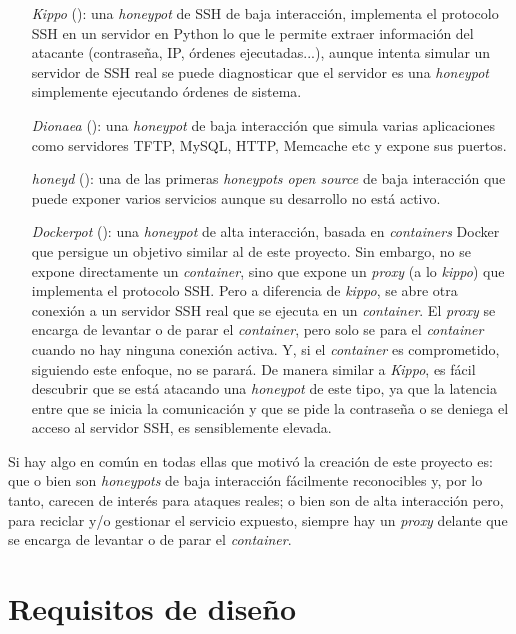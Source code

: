 \begin{enumerate}
    \item[\emph{Kippo}] (\cite{honeynet-kippo}): una \emph{honeypot} de SSH de baja interacción, implementa el protocolo SSH en un servidor en Python
    lo que le permite extraer información del atacante (contraseña, IP, órdenes ejecutadas...), aunque intenta simular un servidor de SSH real
    se puede diagnosticar que el servidor es una \emph{honeypot} simplemente ejecutando órdenes de sistema.
    \item[\emph{Dionaea}] (\cite{honeynet-dionaea}): una \emph{honeypot} de baja interacción que simula varias aplicaciones como servidores TFTP, MySQL, HTTP, Memcache etc y expone sus puertos.
    \item[\emph{honeyd}] (\cite{honeynet-lowinteraction}): una de las primeras \emph{honeypots open source} de baja interacción que puede exponer varios servicios aunque su desarrollo no está activo.
    \item[\emph{Dockerpot}] (\cite{honeynet-dockpot}): una \emph{honeypot} de alta interacción, basada en \emph{containers} Docker que persigue un objetivo similar al de este proyecto.
    Sin embargo, no se expone directamente un \emph{container}, sino que expone un \emph{proxy} (a lo \emph{kippo}) que implementa el protocolo SSH. Pero a diferencia de \emph{kippo}, se abre otra conexión
    a un servidor SSH real que se ejecuta en un \emph{container}. El \emph{proxy} se encarga de levantar o de parar el \emph{container}, pero solo se para el \emph{container} cuando no hay ninguna conexión activa. Y, si el \emph{container} es comprometido, siguiendo este enfoque, no se parará.
    De manera similar a \emph{Kippo}, es fácil descubrir  que se está atacando una \emph{honeypot} de este tipo, ya que la latencia entre que se inicia la comunicación
    y que se pide la contraseña o se deniega el acceso al servidor SSH, es sensiblemente elevada.
\end{enumerate}

Si hay algo en común en todas ellas que motivó la creación de este proyecto es: que o bien son \emph{honeypots} de baja interacción fácilmente reconocibles
y, por lo tanto, carecen de interés para ataques reales; o bien son de alta interacción pero, para reciclar y/o gestionar el servicio expuesto, siempre hay un \emph{proxy} delante
que se encarga de levantar o de parar el \emph{container}.

\section{Requisitos de diseño}

